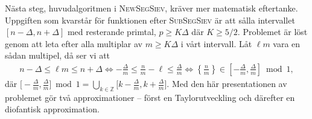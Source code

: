 
Nästa steg, huvudalgoritmen i \textsc{NewSegSiev}, kräver mer matematisk eftertanke. Uppgiften som kvarstår för funktionen efter \textsc{SubSegSiev} är att sålla intervallet \([n - \Delta, n + \Delta]\) med resterande primtal, \( p \geq K \Delta\) där \(K \geq 5/2\). Problemet är löst genom att leta efter alla multiplar av \(m \geq K \Delta\) i vårt intervall. Låt \(\ell m\) vara en sådan multipel, då ser vi att
\begin{align} \label{alg.problem}
    n - \Delta \leq \ell m \leq n + \Delta \Longleftrightarrow 
    - \frac{\Delta}{m} \leq \frac{n}{m} - \ell \leq \frac{\Delta}{m} \Longleftrightarrow \left\{ \frac{n}{m} \right\} \in \left[- \frac{\Delta}{m}, \frac{\Delta}{m} \right] \bmod 1,
\end{align}
där $\big[- \frac{\Delta}{m}, \frac{\Delta}{m} \big] \bmod 1 = \bigcup_{k \in \mathbb{Z}} \big[k - \frac{\Delta}{m}, k + \frac{\Delta}{m} \big]$. Med den här presentationen av problemet gör \cite{HaraldSieve} två approximationer -- först en Taylorutveckling och därefter en diofantisk approximation. 


